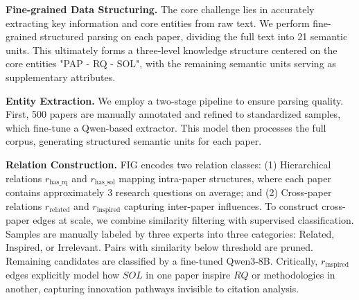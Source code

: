 \documentclass[runningheads]{llncs}
\begin{document}
\textbf{Fine-grained Data Structuring.} The core challenge lies in accurately extracting key information and core entities from raw text. We perform fine-grained structured parsing on each paper, dividing the full text into 21 semantic units. This ultimately forms a three-level knowledge structure centered on the core entities "PAP - RQ - SOL", with the remaining semantic units serving as supplementary attributes.

\textbf{Entity Extraction.} We employ a two-stage pipeline to ensure parsing quality. First, 500 papers are manually annotated and refined to standardized samples, which fine-tune a Qwen-based extractor. This model then processes the full corpus, generating structured semantic units for each paper.

\textbf{Relation Construction.} FIG encodes two relation classes: (1) Hierarchical relations $r_{\text{has\_rq}}$ and $r_{\text{has\_sol}}$ mapping intra-paper structures, where each paper contains approximately 3 research questions on average; and (2) Cross-paper relations $r_{\text{related}}$ and $r_{\text{inspired}}$ capturing inter-paper influences. To construct cross-paper edges at scale, we combine similarity filtering with supervised classification. Samples are manually labeled by three experts into three categories: Related, Inspired, or Irrelevant. Pairs with similarity below threshold are pruned. Remaining candidates are classified by a fine-tuned Qwen3-8B. Critically, $r_{\text{inspired}}$ edges explicitly model how $SOL$ in one paper inspire $RQ$ or methodologies in another, capturing innovation pathways invisible to citation analysis.
\end{document}
